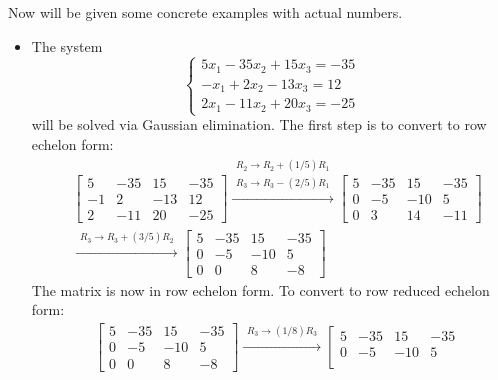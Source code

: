 \documentclass{article}
\begin{document}
Now will be given some concrete examples with actual numbers.
\begin{itemize}
\item 
The system 
\[\left\{\begin{array}{c}
5x_1 - 35x_2 + 15x_3 = -35 \\
-x_1 + 2x_2 - 13x_3 = 12 \\
2x_1 - 11x_2 + 20x_3 = -25
\end{array}\right.\]
will be solved via Gaussian elimination. The first step is to convert to row echelon form:
\begin{align*}
& \left[\begin{array}{ccc|c}
5 & -35 & 15 & -35 \\
-1 & 2 & -13 & 12 \\
2 & -11 & 20 & -25
\end{array}\right]
\xrightarrow{\begin{array}{c} R_2 \rightarrow R_2 + (1/5)R_1 \\ R_3 \rightarrow R_3 - (2/5)R_1 \end{array}}
\left[\begin{array}{ccc|c}
5 & -35 & 15 & -35 \\
0 & -5 & -10 & 5 \\
0 & 3 & 14 & -11
\end{array}\right] \\
& \xrightarrow{\begin{array}{c} R_3 \rightarrow R_3 + (3/5)R_2 \end{array}}
\left[\begin{array}{ccc|c}
5 & -35 & 15 & -35 \\
0 & -5 & -10 & 5 \\
0 & 0 & 8 & -8
\end{array}\right]
\end{align*}
The matrix is now in row echelon form. To convert to row reduced echelon form:
\begin{align*}
& \left[\begin{array}{ccc|c}
5 & -35 & 15 & -35 \\
0 & -5 & -10 & 5 \\
0 & 0 & 8 & -8
\end{array}\right]
\xrightarrow{\begin{array}{c} R_3 \rightarrow (1/8)R_3 \end{array}}
\left[\begin{array}{ccc|c}
5 & -35 & 15 & -35 \\
0 & -5 & -10 & 5 \\

\end{array}
\end{align*}
\end{itemize}
\end{document}
